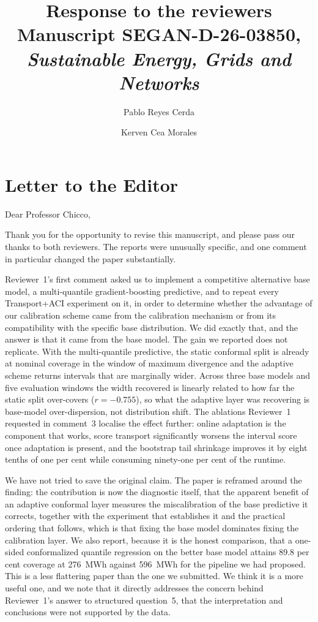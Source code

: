 \documentclass[11pt,a4paper]{article}
\title{\vspace{-1.4cm}\textbf{Response to the reviewers}\\[4pt]
\large Manuscript SEGAN-D-26-03850, \emph{Sustainable Energy, Grids and Networks}}
\author{Pablo Reyes Cerda \and Kerven Cea Morales}
\date{}
\begin{document}
\maketitle
\vspace{-1.0cm}

\section*{Letter to the Editor}

Dear Professor Chicco,

Thank you for the opportunity to revise this manuscript, and please pass our thanks to both reviewers. The reports were unusually specific, and one comment in particular changed the paper substantially.

Reviewer~1's first comment asked us to implement a competitive alternative base model, a multi-quantile gradient-boosting predictive, and to repeat every Transport+ACI experiment on it, in order to determine whether the advantage of our calibration scheme came from the calibration mechanism or from its compatibility with the specific base distribution. We did exactly that, and the answer is that it came from the base model. The gain we reported does not replicate. With the multi-quantile predictive, the static conformal split is already at nominal coverage in the window of maximum divergence and the adaptive scheme returns intervals that are marginally wider. Across three base models and five evaluation windows the width recovered is linearly related to how far the static split over-covers ($r=-0.755$), so what the adaptive layer was recovering is base-model over-dispersion, not distribution shift. The ablations Reviewer~1 requested in comment~3 localise the effect further: online adaptation is the component that works, score transport significantly worsens the interval score once adaptation is present, and the bootstrap tail shrinkage improves it by eight tenths of one per cent while consuming ninety-one per cent of the runtime.

We have not tried to save the original claim. The paper is reframed around the finding: the contribution is now the diagnostic itself, that the apparent benefit of an adaptive conformal layer measures the miscalibration of the base predictive it corrects, together with the experiment that establishes it and the practical ordering that follows, which is that fixing the base model dominates fixing the calibration layer. We also report, because it is the honest comparison, that a one-sided conformalized quantile regression on the better base model attains 89.8 per cent coverage at 276~MWh against 596~MWh for the pipeline we had proposed. This is a less flattering paper than the one we submitted. We think it is a more useful one, and we note that it directly addresses the concern behind Reviewer~1's answer to structured question~5, that the interpretation and conclusions were not supported by the data.
\end{document}
